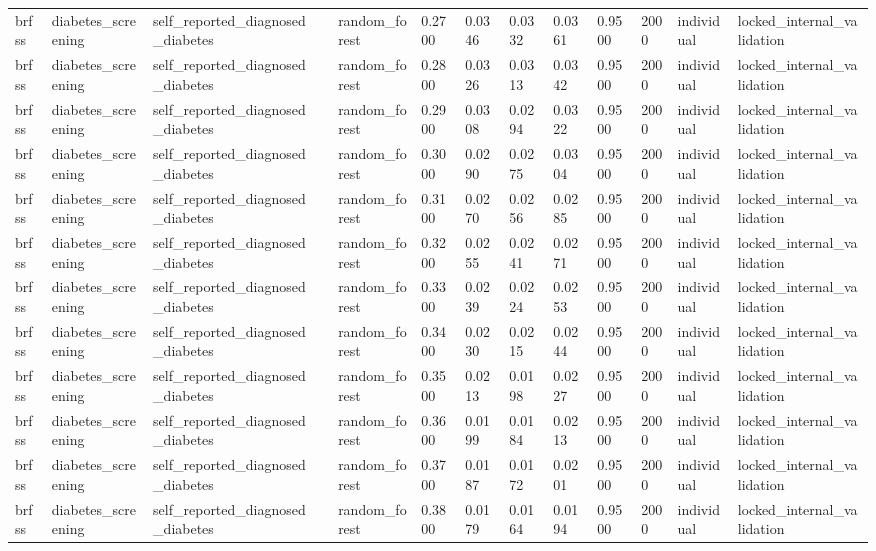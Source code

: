 \begin{tabular}{lllllllllllll}
brfss & diabetes\_screening & self\_reported\_diagnosed\_diabetes &  & random\_forest & 0.2700 & 0.0346 & 0.0332 & 0.0361 & 0.9500 & 2000 & individual & locked\_internal\_validation \\
brfss & diabetes\_screening & self\_reported\_diagnosed\_diabetes &  & random\_forest & 0.2800 & 0.0326 & 0.0313 & 0.0342 & 0.9500 & 2000 & individual & locked\_internal\_validation \\
brfss & diabetes\_screening & self\_reported\_diagnosed\_diabetes &  & random\_forest & 0.2900 & 0.0308 & 0.0294 & 0.0322 & 0.9500 & 2000 & individual & locked\_internal\_validation \\
brfss & diabetes\_screening & self\_reported\_diagnosed\_diabetes &  & random\_forest & 0.3000 & 0.0290 & 0.0275 & 0.0304 & 0.9500 & 2000 & individual & locked\_internal\_validation \\
brfss & diabetes\_screening & self\_reported\_diagnosed\_diabetes &  & random\_forest & 0.3100 & 0.0270 & 0.0256 & 0.0285 & 0.9500 & 2000 & individual & locked\_internal\_validation \\
brfss & diabetes\_screening & self\_reported\_diagnosed\_diabetes &  & random\_forest & 0.3200 & 0.0255 & 0.0241 & 0.0271 & 0.9500 & 2000 & individual & locked\_internal\_validation \\
brfss & diabetes\_screening & self\_reported\_diagnosed\_diabetes &  & random\_forest & 0.3300 & 0.0239 & 0.0224 & 0.0253 & 0.9500 & 2000 & individual & locked\_internal\_validation \\
brfss & diabetes\_screening & self\_reported\_diagnosed\_diabetes &  & random\_forest & 0.3400 & 0.0230 & 0.0215 & 0.0244 & 0.9500 & 2000 & individual & locked\_internal\_validation \\
brfss & diabetes\_screening & self\_reported\_diagnosed\_diabetes &  & random\_forest & 0.3500 & 0.0213 & 0.0198 & 0.0227 & 0.9500 & 2000 & individual & locked\_internal\_validation \\
brfss & diabetes\_screening & self\_reported\_diagnosed\_diabetes &  & random\_forest & 0.3600 & 0.0199 & 0.0184 & 0.0213 & 0.9500 & 2000 & individual & locked\_internal\_validation \\
brfss & diabetes\_screening & self\_reported\_diagnosed\_diabetes &  & random\_forest & 0.3700 & 0.0187 & 0.0172 & 0.0201 & 0.9500 & 2000 & individual & locked\_internal\_validation \\
brfss & diabetes\_screening & self\_reported\_diagnosed\_diabetes &  & random\_forest & 0.3800 & 0.0179 & 0.0164 & 0.0194 & 0.9500 & 2000 & individual & locked\_internal\_validation \\

\end{tabular}
